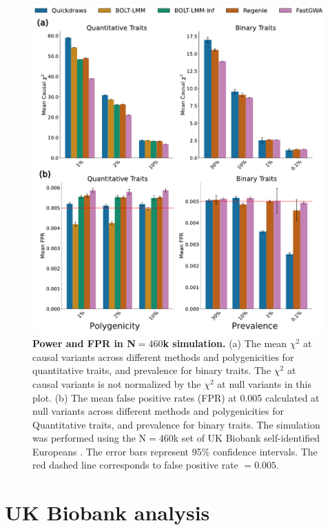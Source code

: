 \begin{figure}[h]
    \centering
    \includegraphics[scale=1]{figures/qd_panel_sim2.pdf}
    \caption{\textbf{Power and FPR in N$=460$k simulation.}
    (a) The mean $\chi^2$ at causal variants across different methods and polygenicities for quantitative traits, and prevalence for binary traits. The $\chi^2$ at causal variants is not normalized by the $\chi^2$ at null variants in this plot.
    (b) The mean false positive rates (FPR) at 0.005 calculated at null variants across different methods and polygenicities for Quantitative traits, and prevalence for binary traits.
    The simulation was performed using the N$=460$k set of UK Biobank self-identified Europeans \cite{bycroft2018uk}. The error bars represent 95\% confidence intervals.
    The red dashed line corresponds to false positive rate $=0.005$.
    }
    \label{fig:sim_460k}
\end{figure}

\clearpage

\section{UK Biobank analysis}
\label{sec:ch5-ukb}


